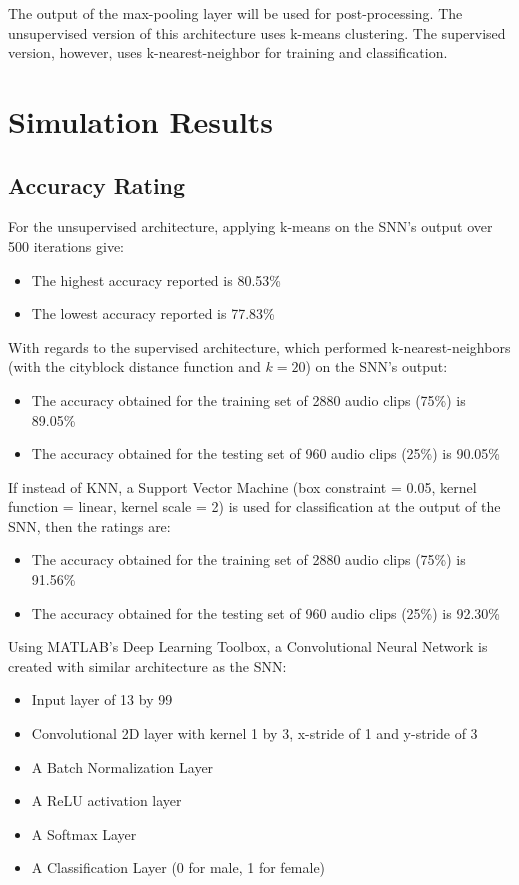 \documentclass[11pt]{article}  %
\begin{document}
The output of the max-pooling layer will be used for post-processing. The unsupervised version of this architecture uses k-means clustering. The supervised version, however, uses k-nearest-neighbor for training and classification. 

\section{Simulation Results}
\label{sim_res}

\subsection{Accuracy Rating}

For the unsupervised architecture, applying k-means on the SNN's output over 500 iterations give: 
\begin{itemize}
	\item The highest accuracy reported is 80.53\%
	\item The lowest accuracy reported is 77.83\%
\end{itemize}


With regards to the supervised architecture, which performed k-nearest-neighbors (with the cityblock distance function and $k=20$) on the SNN's output:
\begin{itemize}
	\item The accuracy obtained for the training set of 2880 audio clips (75\%) is 89.05\%
	\item The accuracy obtained for the testing set of 960 audio clips (25\%) is 90.05\%
\end{itemize}


If instead of KNN, a Support Vector Machine (box constraint = 0.05, kernel function = linear, kernel scale = 2) is used for classification at the output of the SNN, then the ratings are:
\begin{itemize}
	\item The accuracy obtained for the training set of 2880 audio clips (75\%) is 91.56\%
	\item The accuracy obtained for the testing set of 960 audio clips (25\%) is 92.30\%
\end{itemize}

Using MATLAB's Deep Learning Toolbox, a Convolutional Neural Network is created with similar architecture as the SNN:

\begin{itemize}
	\item Input layer of 13 by 99
	\item Convolutional 2D layer with kernel 1 by 3, x-stride of 1 and y-stride of 3
	\item A Batch Normalization Layer
	\item A ReLU activation layer
	\item A Softmax Layer
	\item A Classification Layer (0 for male, 1 for female)
\end{itemize}
\end{document}

